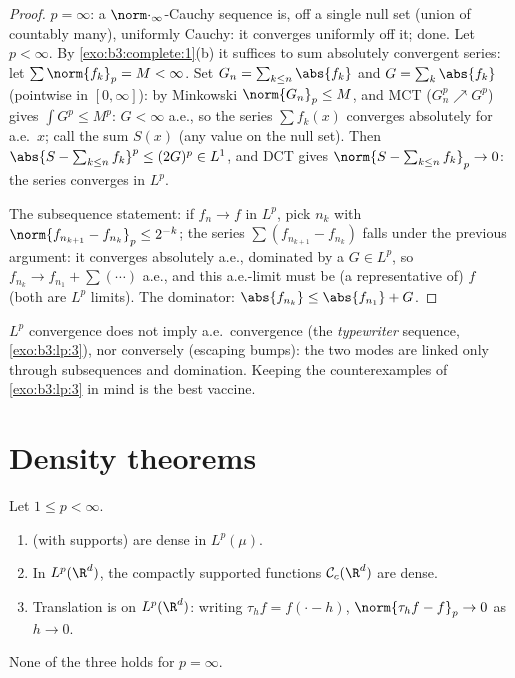 \begin{proof}
$p = \infty$: a $\norm\cdot_\infty$-Cauchy sequence is, off a
single null set (union of countably many), uniformly Cauchy:
it converges uniformly off it; done. Let $p < \infty$. By
\cref{exo:b3:complete:1}(b) it suffices to sum absolutely
convergent series: let $\sum\norm{f_k}_p = M < \infty$. Set
$G_n = \sum_{k \leq n}\abs{f_k}$ and $G = \sum_k\abs{f_k}$
(pointwise in $[0,\infty]$): by Minkowski $\norm{G_n}_p \leq
M$, and MCT ($G_n^p \nearrow G^p$) gives $\int G^p \leq M^p$:
$G < \infty$ a.e., so the series $\sum f_k(x)$ converges
absolutely for a.e.\ $x$; call the sum $S(x)$ (any value on
the null set). Then $\abs{S - \sum_{k\leq n}f_k}^p \leq (2G)^p
\in L^1$, and DCT gives $\norm{S - \sum_{k\leq n}f_k}_p \to 0$:
the series converges in $L^p$.

The subsequence statement: if $f_n \to f$ in $L^p$, pick $n_k$
with $\norm{f_{n_{k+1}} - f_{n_k}}_p \leq 2^{-k}$; the series
$\sum(f_{n_{k+1}} - f_{n_k})$ falls under the previous
argument: it converges absolutely a.e., dominated by a $G \in
L^p$, so $f_{n_k} \to f_{n_1} + \sum(\cdots) $ a.e., and this
a.e.-limit must be (a representative of) $f$ (both are $L^p$
limits). The dominator: $\abs{f_{n_k}} \leq \abs{f_{n_1}} + G$.
\end{proof}

\begin{remark}\label{rem:b3:lp:modes}
$L^p$ convergence does not imply a.e.\ convergence (the
\emph{typewriter} sequence, \cref{exo:b3:lp:3}), nor
conversely (escaping bumps): the two modes are linked only
through subsequences and domination. Keeping the counterexamples
of \cref{exo:b3:lp:3} in mind is the best vaccine.
\end{remark}

\section{Density theorems}

\begin{theorem}\label{thm:b3:lp:density}
Let $1 \leq p < \infty$.
\begin{enumerate}
  \item {} (with  supports) are
        dense in $L^p(\mu)$.
  \item In $L^p(\R^d)$, the  compactly supported
        functions $\mathcal C_c(\R^d)$ are dense.
  \item Translation is  on $L^p(\R^d)$: writing
        $\tau_hf = f(\cdot - h)$, $\norm{\tau_hf - f}_p \to 0$
        as $h \to 0$.
\end{enumerate}
None of the three holds for $p = \infty$.
\end{theorem}

